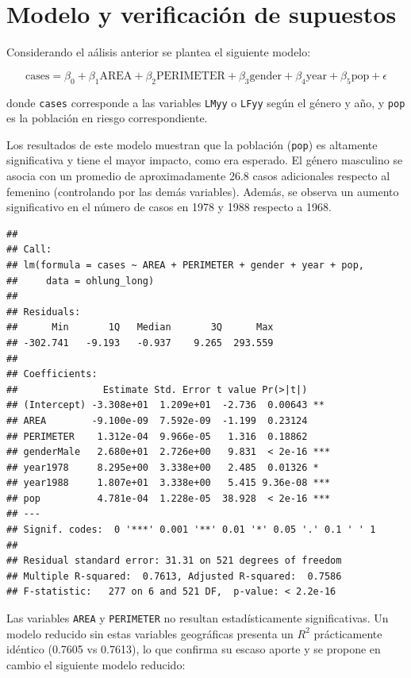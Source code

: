 \documentclass[
  12pt,
]{article}
\begin{document}
\section{Modelo y verificación de supuestos}\label{ejem}

Considerando el aálisis anterior se plantea el siguiente modelo:

\[ \text{cases} = \beta_0 + \beta_1 \text{AREA} + \beta_2 \text{PERIMETER} + \beta_3 \text{gender} + \beta_4 \text{year} + \beta_5 \text{pop} + \epsilon \]

donde \texttt{cases} corresponde a las variables \texttt{LMyy} o
\texttt{LFyy} según el género y año, y \texttt{pop} es la población en
riesgo correspondiente.

Los resultados de este modelo muestran que la población (\texttt{pop})
es altamente significativa y tiene el mayor impacto, como era esperado.
El género masculino se asocia con un promedio de aproximadamente 26.8
casos adicionales respecto al femenino (controlando por las demás
variables). Además, se observa un aumento significativo en el número de
casos en 1978 y 1988 respecto a 1968.

\begin{verbatim}
## 
## Call:
## lm(formula = cases ~ AREA + PERIMETER + gender + year + pop, 
##     data = ohlung_long)
## 
## Residuals:
##      Min       1Q   Median       3Q      Max 
## -302.741   -9.193   -0.937    9.265  293.559 
## 
## Coefficients:
##               Estimate Std. Error t value Pr(>|t|)    
## (Intercept) -3.308e+01  1.209e+01  -2.736  0.00643 ** 
## AREA        -9.100e-09  7.592e-09  -1.199  0.23124    
## PERIMETER    1.312e-04  9.966e-05   1.316  0.18862    
## genderMale   2.680e+01  2.726e+00   9.831  < 2e-16 ***
## year1978     8.295e+00  3.338e+00   2.485  0.01326 *  
## year1988     1.807e+01  3.338e+00   5.415 9.36e-08 ***
## pop          4.781e-04  1.228e-05  38.928  < 2e-16 ***
## ---
## Signif. codes:  0 '***' 0.001 '**' 0.01 '*' 0.05 '.' 0.1 ' ' 1
## 
## Residual standard error: 31.31 on 521 degrees of freedom
## Multiple R-squared:  0.7613, Adjusted R-squared:  0.7586 
## F-statistic:   277 on 6 and 521 DF,  p-value: < 2.2e-16
\end{verbatim}

Las variables \texttt{AREA} y \texttt{PERIMETER} no resultan
estadísticamente significativas. Un modelo reducido sin estas variables
geográficas presenta un \(R^2\) prácticamente idéntico (0.7605 vs
0.7613), lo que confirma su escaso aporte y se propone en cambio el
siguiente modelo reducido:
\end{document}
